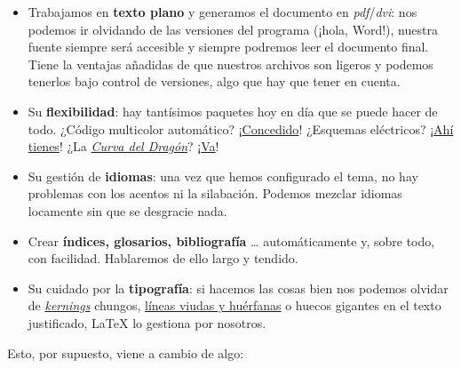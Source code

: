 \begin{itemize}
\item
  Trabajamos en \textbf{texto plano} y generamos el documento en
  \emph{pdf}/\emph{dvi}: nos podemos ir olvidando de las versiones del
  programa (¡hola, Word!), nuestra fuente siempre será accesible y
  siempre podremos leer el documento final. Tiene la ventajas añadidas
  de que nuestros archivos son ligeros y podemos tenerlos bajo control
  de versiones, algo que hay que tener en cuenta.
\item
  Su \textbf{flexibilidad}: hay tantísimos paquetes hoy en día que se
  puede hacer de todo. ¿Código multicolor automático?
  ¡\href{https://www.ctan.org/pkg/listings}{Concedido}! ¿Esquemas
  eléctricos?
  ¡\href{http://www.texample.net/tikz/examples/circuitikz/}{Ahí tienes}!
  ¿La \href{https://www.youtube.com/watch?v=wCyC-K_PnRY}{\emph{Curva del
  Dragón}}?
  ¡\href{http://tex.stackexchange.com/questions/230457/drawing-the-dragon-curve\#230504}{Va}!
\item
  Su gestión de \textbf{idiomas}: una vez que hemos configurado el tema,
  no hay problemas con los acentos ni la silabación. Podemos mezclar
  idiomas locamente sin que se desgracie nada.
\item
  Crear \textbf{índices, glosarios, bibliografía} \ldots{}
  automáticamente y, sobre todo, con facilidad. Hablaremos de ello largo
  y tendido.
\item
  Su cuidado por la \textbf{tipografía}: si hacemos las cosas bien nos
  podemos olvidar de
  \href{https://en.wikipedia.org/wiki/Kerning}{\emph{kernings}} chungos,
  \href{https://es.wikipedia.org/wiki/Viuda_y_hu\%C3\%A9rfana}{líneas
  viudas y huérfanas} o huecos gigantes en el texto justificado, LaTeX
  lo gestiona por nosotros.
\end{itemize}

Esto, por supuesto, viene a cambio de algo:

